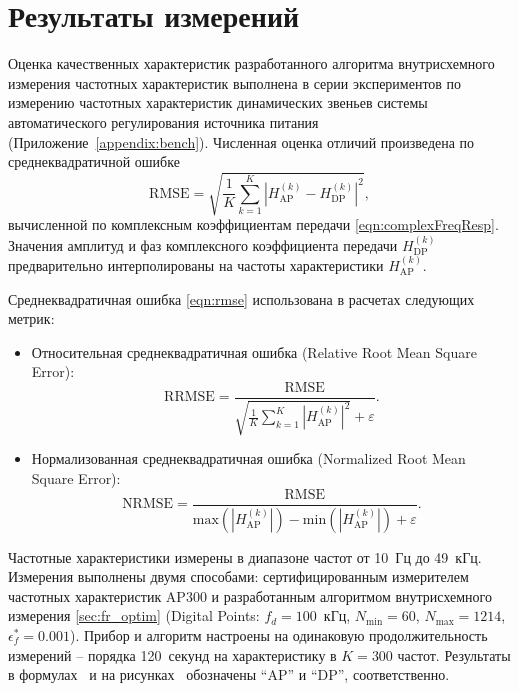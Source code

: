 \section{Результаты измерений}

Оценка качественных характеристик разработанного алгоритма внутрисхемного измерения частотных характеристик выполнена в серии экспериментов по измерению частотных характеристик динамических звеньев системы автоматического регулирования источника питания (Приложение~\ref{appendix:bench}). Численная оценка отличий произведена по среднеквадратичной ошибке
\begin{equation}\label{eqn:rmse}
    \text{RMSE} = \sqrt{\frac{1}{K} \sum_{k=1}^{K} \left|{H_\text{AP}^{(k)} - H_\text{DP}^{(k)}}\right|^2},
\end{equation}
вычисленной по комплексным коэффициентам передачи \eqref{eqn:complexFreqResp}. Значения амплитуд и фаз комплексного коэффициента передачи ${H_\text{DP}^{(k)}}$ предварительно интерполированы на частоты характеристики ${H_\text{AP}^{(k)}}$.

Среднеквадратичная ошибка \eqref{eqn:rmse} использована в расчетах следующих метрик:
\begin{itemize}
	\item Относительная среднеквадратичная ошибка (Relative Root Mean Square Error):
	\begin{equation}\label{eqn:rrmse}
		\text{RRMSE} = \frac{\text{RMSE}}{\sqrt{\frac{1}{K} \sum_{k=1}^{K} \left| H_\text{AP}^{(k)}\right|^2} + \varepsilon}.
	\end{equation}

	\item Нормализованная среднеквадратичная ошибка (Normalized Root Mean Square Error):
	\begin{equation}\label{eqn:nrmse}
		\text{NRMSE} = \frac{\text{RMSE}}{\text{max} \left(\left|H_\text{AP}^{(k)}\right|\right) - \text{min} \left(\left|H_\text{AP}^{(k)}\right|\right) + \varepsilon}.
	\end{equation}
\end{itemize}

Частотные характеристики измерены в диапазоне частот от 10~Гц до 49~кГц. Измерения выполнены двумя способами: сертифицированным измерителем частотных характеристик AP300 и разработанным алгоритмом внутрисхемного измерения \ref{sec:fr_optim} (Digital Points: ${f_d=100}$~кГц, ${N_\text{min}=60}$, ${N_\text{max}=1214}$, ${\epsilon^{*}_{f}=\num{0.001}}$). Прибор и алгоритм настроены на одинаковую продолжительность измерений -- порядка 120~секунд на характеристику в ${K=300}$ частот. Результаты в формулах~ и на рисунках~ обозначены \enquote{AP} и \enquote{DP}, соответственно.

